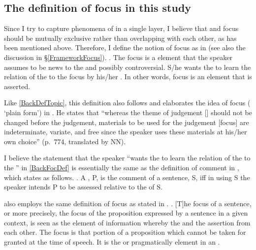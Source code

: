 \subsection{The definition of focus in this study}\label{BackSubsecDefFocus}

Since I try to capture phenomena of  in a single layer,
I believe that  and focus should be mutually exclusive rather than overlapping with each other,
as has been mentioned above.
Therefore, I define the notion of focus as in \Next
(see also the discussion in \S \ref{FrameworkFocus}).
%
\ex. The focus is a  element that the speaker assumes to be news to the  and possibly controversial.
S/he wants the  to learn the relation of the  to the focus by his/her .
In other words, focus is an element that is asserted.
\label{BackFocDef}

Like \ref{BackDefTopic},
this definition also follows and elaborates the idea of focus ( `plain form') in .
He states that ``whereas the theme of judgement [] should not be changed before the judgement, materials to be used for the judgement [focus] are indeterminate, variate, and free since the speaker uses these materials at his/her own choice'' (p.~774, translated by NN).

I believe the statement that the speaker ``wants the  to learn the relation of the  to the '' in \ref{BackFocDef} is essentially the same as the definition of comment in ,
which states as follows.
%
\ex. A , P, is the comment of a sentence, S, iff in using S the speaker intends P to be assessed relative to the  of S.
     \hfill{\cite[210]{gundel88}}

 \cite[based on][]{halliday67} also employs the same definition of focus as stated in \Next.
%
\ex. [T]he focus of a sentence, or more precisely,
  the focus of the proposition expressed by a sentence
  in a given  context,
  is seen as the element of information whereby the  
  and the assertion  from each other.
  The focus is that portion of a proposition which
  cannot be taken for granted at the time of speech.
  It is the  or pragmatically
   element in an .
  \hfill{\cite[207, underlined by the original author]{lambrecht94}}

